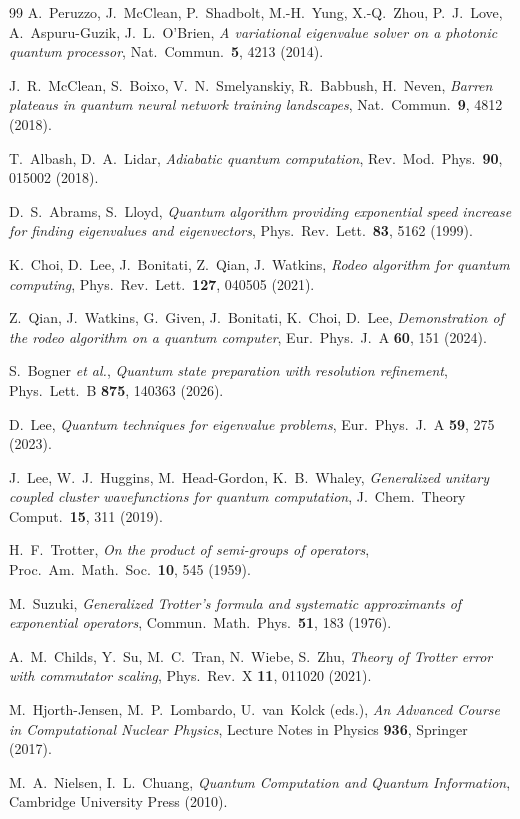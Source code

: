 \documentclass[11pt]{article}
\begin{document}
\begin{thebibliography}{99}
A.~Peruzzo, J.~McClean, P.~Shadbolt, M.-H.~Yung, X.-Q.~Zhou, P.~J.~Love,
A.~Aspuru-Guzik, J.~L.~O'Brien,
\textit{A variational eigenvalue solver on a photonic quantum processor},
Nat.\ Commun.\ \textbf{5}, 4213 (2014).

J.~R.~McClean, S.~Boixo, V.~N.~Smelyanskiy, R.~Babbush, H.~Neven,
\textit{Barren plateaus in quantum neural network training landscapes},
Nat.\ Commun.\ \textbf{9}, 4812 (2018).

T.~Albash, D.~A.~Lidar,
\textit{Adiabatic quantum computation},
Rev.\ Mod.\ Phys.\ \textbf{90}, 015002 (2018).

D.~S.~Abrams, S.~Lloyd,
\textit{Quantum algorithm providing exponential speed increase for finding
eigenvalues and eigenvectors},
Phys.\ Rev.\ Lett.\ \textbf{83}, 5162 (1999).

K.~Choi, D.~Lee, J.~Bonitati, Z.~Qian, J.~Watkins,
\textit{Rodeo algorithm for quantum computing},
Phys.\ Rev.\ Lett.\ \textbf{127}, 040505 (2021).

Z.~Qian, J.~Watkins, G.~Given, J.~Bonitati, K.~Choi, D.~Lee,
\textit{Demonstration of the rodeo algorithm on a quantum computer},
Eur.\ Phys.\ J.\ A \textbf{60}, 151 (2024).

S.~Bogner \textit{et al.},
\textit{Quantum state preparation with resolution refinement},
Phys.\ Lett.\ B \textbf{875}, 140363 (2026).

D.~Lee,
\textit{Quantum techniques for eigenvalue problems},
Eur.\ Phys.\ J.\ A \textbf{59}, 275 (2023).

J.~Lee, W.~J.~Huggins, M.~Head-Gordon, K.~B.~Whaley,
\textit{Generalized unitary coupled cluster wavefunctions for quantum computation},
J.\ Chem.\ Theory Comput.\ \textbf{15}, 311 (2019).

H.~F.~Trotter,
\textit{On the product of semi-groups of operators},
Proc.\ Am.\ Math.\ Soc.\ \textbf{10}, 545 (1959).

M.~Suzuki,
\textit{Generalized Trotter's formula and systematic approximants of exponential
operators},
Commun.\ Math.\ Phys.\ \textbf{51}, 183 (1976).

A.~M.~Childs, Y.~Su, M.~C.~Tran, N.~Wiebe, S.~Zhu,
\textit{Theory of Trotter error with commutator scaling},
Phys.\ Rev.\ X \textbf{11}, 011020 (2021).

M.~Hjorth-Jensen, M.~P.~Lombardo, U.~van~Kolck (eds.),
\textit{An Advanced Course in Computational Nuclear Physics},
Lecture Notes in Physics \textbf{936}, Springer (2017).

M.~A.~Nielsen, I.~L.~Chuang,
\textit{Quantum Computation and Quantum Information},
Cambridge University Press (2010).
\end{thebibliography}
\end{document}
